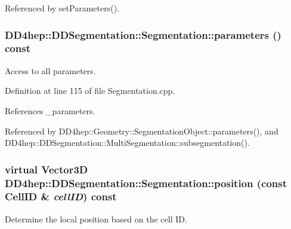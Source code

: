 Referenced by setParameters().\hypertarget{class_d_d4hep_1_1_d_d_segmentation_1_1_segmentation_afd9f22b31cc261bfe3fd20e79be79dd5}{
\subsubsection[{parameters}]{ DD4hep::DDSegmentation::Segmentation::parameters () const}}
\label{class_d_d4hep_1_1_d_d_segmentation_1_1_segmentation_afd9f22b31cc261bfe3fd20e79be79dd5}


Access to all parameters. 

Definition at line 115 of file Segmentation.cpp.

References \_\-parameters.

Referenced by DD4hep::Geometry::SegmentationObject::parameters(), and DD4hep::DDSegmentation::MultiSegmentation::subsegmentation().\hypertarget{class_d_d4hep_1_1_d_d_segmentation_1_1_segmentation_a594fe6d78667415855858d083b64acad}{
\subsubsection[{position}]{\setlength{\rightskip}{0pt plus 5cm}virtual {\bf Vector3D} DD4hep::DDSegmentation::Segmentation::position (const {\bf CellID} \& {\em cellID}) const}}
\label{class_d_d4hep_1_1_d_d_segmentation_1_1_segmentation_a594fe6d78667415855858d083b64acad}


Determine the local position based on the cell ID. 

